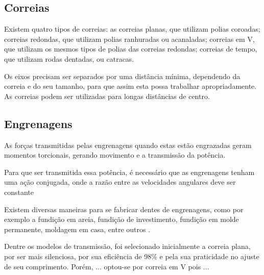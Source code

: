 \subsection{Correias}
Existem quatro tipos de correias: as correias planas, que utilizam polias coroadas; correias redondas, que utilizam polias ranhuradas ou acanaladas; correias em V, que utilizam os mesmos tipos de polias das correias redondas; correias de tempo, que utilizam rodas dentadas, ou catracas.
	
\par Os eixos precisam ser separados por uma distância mínima, dependendo da correia e do seu tamanho, para que assim esta possa trabalhar apropriadamente. As correias podem ser utilizadas para longas distâncias de centro.


\subsection{Engrenagens}
As forças transmitidas pelas engrenagens quando estas estão engrazadas geram momentos torcionais, gerando movimento e a transmissão da potência.

\par Para que ser transmitida essa potência, é necessário que as engrenagens tenham uma ação conjugada, onde a razão entre as velocidades angulares deve ser constante

\par Existem diversas maneiras para se fabricar dentes de engrenagens, como por exemplo a fundição em areia, fundição de investimento, fundição em molde permanente, moldagem em casa, entre outros \cite{Projmaq}.
\par Dentre os modelos de transmissão, foi selecionado inicialmente a correia plana, por ser mais silenciosa, por sua eficiência de 98\% e pela sua praticidade no ajuste de seu comprimento. Porém, ... optou-se por correia em V pois ...








	



























